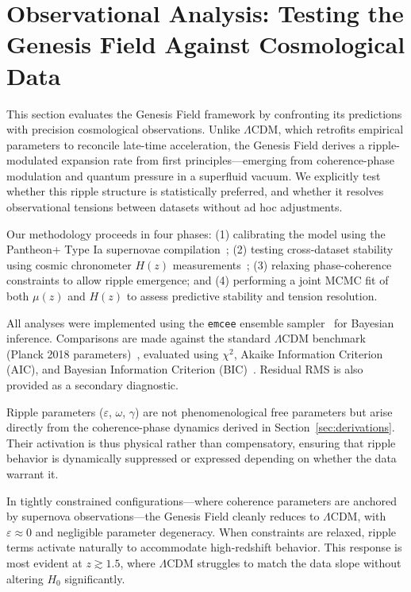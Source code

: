 \section{Observational Analysis: Testing the Genesis Field Against Cosmological Data}
\label{sec:observations}

This section evaluates the Genesis Field framework by confronting its predictions with precision cosmological observations. Unlike $\Lambda$CDM, which retrofits empirical parameters to reconcile late-time acceleration, the Genesis Field derives a ripple-modulated expansion rate from first principles—emerging from coherence-phase modulation and quantum pressure in a superfluid vacuum. We explicitly test whether this ripple structure is statistically preferred, and whether it resolves observational tensions between datasets without ad hoc adjustments.

Our methodology proceeds in four phases: (1) calibrating the model using the Pantheon+ Type Ia supernovae compilation~\cite{Brout2022, Scolnic2018}; (2) testing cross-dataset stability using cosmic chronometer $H(z)$ measurements~\cite{Moresco2016, Stern2010, Farooq2017}; (3) relaxing phase-coherence constraints to allow ripple emergence; and (4) performing a joint MCMC fit of both $\mu(z)$ and $H(z)$ to assess predictive stability and tension resolution.

All analyses were implemented using the \texttt{emcee} ensemble sampler~\cite{ForemanMackey2013} for Bayesian inference. Comparisons are made against the standard $\Lambda$CDM benchmark (Planck 2018 parameters)~\cite{Planck2018}, evaluated using $\chi^2$, Akaike Information Criterion (AIC), and Bayesian Information Criterion (BIC)~\cite{Liddle2007, Burnham2002}. Residual RMS is also provided as a secondary diagnostic.

Ripple parameters ($\varepsilon$, $\omega$, $\gamma$) are not phenomenological free parameters but arise directly from the coherence-phase dynamics derived in Section~\ref{sec:derivations}. Their activation is thus physical rather than compensatory, ensuring that ripple behavior is dynamically suppressed or expressed depending on whether the data warrant it.

In tightly constrained configurations—where coherence parameters are anchored by supernova observations—the Genesis Field cleanly reduces to $\Lambda$CDM, with $\varepsilon \approx 0$ and negligible parameter degeneracy. When constraints are relaxed, ripple terms activate naturally to accommodate high-redshift behavior. This response is most evident at $z \gtrsim 1.5$, where $\Lambda$CDM struggles to match the data slope without altering $H_0$ significantly.

